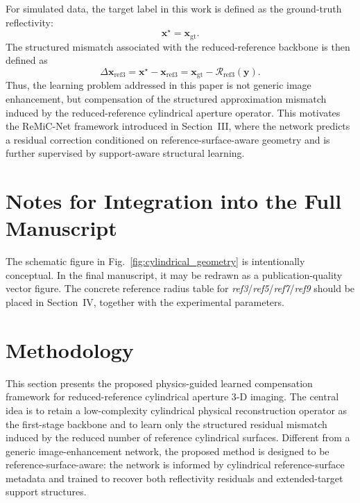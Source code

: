 \documentclass[journal]{IEEEtran}
\begin{document}
For simulated data, the target label in this work is defined as the ground-truth reflectivity:
\begin{equation}
\mathbf{x}^{\star}=\mathbf{x}_{\mathrm{gt}}.
\label{eq:gt_label}
\end{equation}
The structured mismatch associated with the reduced-reference backbone is then defined as
\begin{equation}
 \Delta\mathbf{x}_{\mathrm{ref3}}
 =
 \mathbf{x}^{\star}-\mathbf{x}_{\mathrm{ref3}}
 =
 \mathbf{x}_{\mathrm{gt}}-\mathcal{R}_{\mathrm{ref3}}(\mathbf{y}).
\label{eq:ref3_residual}
\end{equation}
Thus, the learning problem addressed in this paper is not generic image enhancement, but compensation of the structured approximation mismatch induced by the reduced-reference cylindrical aperture operator. This motivates the ReMiC-Net framework introduced in Section~III, where the network predicts a residual correction conditioned on reference-surface-aware geometry and is further supervised by support-aware structural learning.

\section*{Notes for Integration into the Full Manuscript}
The schematic figure in Fig.~\ref{fig:cylindrical_geometry} is intentionally conceptual. In the final manuscript, it may be redrawn as a publication-quality vector figure. The concrete reference radius table for \emph{ref3}/\emph{ref5}/\emph{ref7}/\emph{ref9} should be placed in Section~IV, together with the experimental parameters.


\section{Methodology}
\label{sec:methodology}

This section presents the proposed physics-guided learned compensation framework for reduced-reference cylindrical aperture 3-D imaging. The central idea is to retain a low-complexity cylindrical physical reconstruction operator as the first-stage backbone and to learn only the structured residual mismatch induced by the reduced number of reference cylindrical surfaces. Different from a generic image-enhancement network, the proposed method is designed to be reference-surface-aware: the network is informed by cylindrical reference-surface metadata and trained to recover both reflectivity residuals and extended-target support structures.
\end{document}
